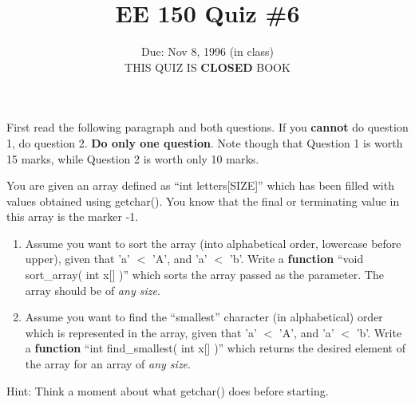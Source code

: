 \setcounter{page}{1}



\title{EE 150 Quiz \#6}
\author{Due: Nov 8, 1996 (in class) \\ THIS QUIZ IS {\bf CLOSED} BOOK}
\date{}
\maketitle

First read the following paragraph and both questions.  If you {\bf cannot} do
question 1, do question 2.  {\bf Do only one question}.  Note though that
Question 1 is worth 15 marks, while Question 2 is worth only 10 marks.

You are given an array defined as ``int letters[SIZE]'' which has been
filled with values obtained using getchar().  You know that the final or
terminating value in this array is the marker -1. 

\begin{enumerate}
\item Assume you want to sort the array (into alphabetical order, lowercase
before upper), given that 'a' $<$ 'A', and 'a' $<$ 'b'.   Write a {\bf
function} ``void sort\_array( int x[] )'' which sorts the array passed as the
parameter.  The array should be of {\em any size}. 

\item  Assume you want to find the ``smallest'' character (in alphabetical)
order which is represented in the array, given that 'a' $<$ 'A', and 'a' $<$
'b'.  Write a {\bf function} ``int find\_smallest( int x[] )'' which returns
the desired element of the array for an array of {\em any size}.
\end{enumerate}

Hint: Think a moment about what getchar() does before starting.  



